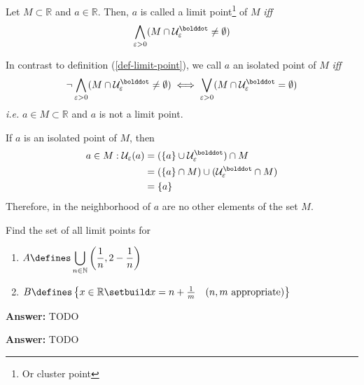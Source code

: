 \begin{definition}\label{def-limit-point}
	Let $M\subset\mathbb{R}$ and $a\in\mathbb{R}$. Then, $a$ is called a limit
	point\footnote{Or cluster point} of $M$ \textit{iff}
	\begin{equation}
		\bigwedge_{\varepsilon>0}(M\cap\mathcal{U}_\varepsilon^{\bolddot}\neq\emptyset)
	\end{equation}
\end{definition}

\begin{definition}\label{def-isolated-point}
	In contrast to definition (\ref{def-limit-point}), we call $a$ an isolated point
	of $M$ \textit{iff}
	\begin{equation}
		\neg\bigwedge_{\varepsilon>0}(M\cap\mathcal{U}_\varepsilon^{\bolddot}\neq\emptyset)
		\iff
		\bigvee_{\varepsilon>0}(M\cap\mathcal{U}_\varepsilon^{\bolddot}=\emptyset)
	\end{equation}
	\textit{i.e.} $a\in M\subset\mathbb{R}$ and $a$ is not a limit point.
\end{definition}

\begin{rem}
	If $a$ is an isolated point of $M$, then \cite[p.67]{wuest2009}
	\begin{align*}
		a\in M:\mathcal{U}_\varepsilon(a)
		 & =(\{a\}\cup\mathcal{U}_\varepsilon^{\bolddot})\cap M         \\
		 & =(\{a\}\cap M)\cup(\mathcal{U}_\varepsilon^{\bolddot}\cap M) \\
		 & =\{a\}
	\end{align*}
	Therefore, in the neighborhood of $a$ are no other elements of the set $M$.
\end{rem}

\begin{exm}\label{exm-limit-points}
	Find the set of all limit points for
	\begin{enumerate}
		\item $A\defines\displaystyle\bigcup_{n\in\mathbb{N}}\left(\frac{1}{n},2-\frac{1}{n}\right)$
		\item $B\defines\left\{x\in\mathbb{R}\setbuild x=n+\frac{1}{m}\quad\text{($n,m$ appropriate)}\right\}$
	\end{enumerate}
	\begin{flushleft}
		\textbf{ Answer:} TODO
	\end{flushleft}
	\begin{flushleft}
		\textbf{ Answer:} TODO
	\end{flushleft}
\end{exm}

